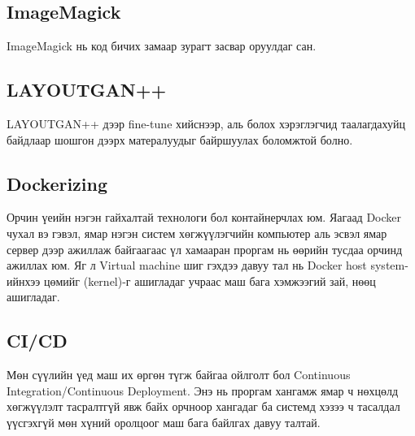 \subsection{ImageMagick}
ImageMagick нь код бичих замаар зурагт засвар оруулдаг сан.
\subsection{LAYOUTGAN++}
LAYOUTGAN++ дээр fine-tune хийснээр, аль болох хэрэглэгчид таалагдахуйц байдлаар шошгон дээрх матералуудыг байршуулах боломжтой болно.
\subsection{Dockerizing}
Орчин үеийн нэгэн гайхалтай технологи бол контайнерчлах юм. Яагаад Docker чухал вэ гэвэл, ямар нэгэн систем хөгжүүлэгчийн компьютер аль эсвэл ямар сервер дээр ажиллаж байгаагаас үл хамааран проргам нь өөрийн тусдаа орчинд ажиллах юм. Яг л Virtual machine шиг гэхдээ давуу тал нь Docker host system-ийнхээ цөмийг (kernel)-г ашигладаг учраас маш бага хэмжээгий зай, нөөц ашигладаг.
\subsection{CI/CD}
Мөн сүүлийн үед маш их өргөн түгж байгаа ойлголт бол Continuous Integration/Continuous Deployment.
Энэ нь проргам хангамж ямар ч нөхцөлд хөгжүүлэлт тасралтгүй явж байх орчноор хангадаг ба системд хэзээ ч тасалдал үүсгэхгүй мөн хүний оролцоог маш бага байлгах давуу талтай.